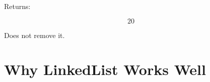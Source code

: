 \documentclass[11pt,a4paper]{book}
\begin{document}
Returns:

\[
20
\]


Does not remove it.
























\section{Why LinkedList Works Well}
\end{document}
